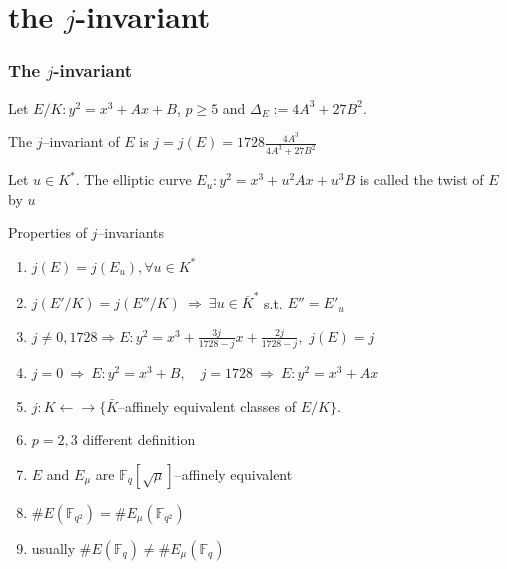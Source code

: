 \documentclass[10pt,handout]{beamer} %
\newcommand{\F}{\mathbb F}
\theoremstyle{definition}
\begin{document}

\section{the \texorpdfstring{$j$}{j}-invariant}
\begin{frame}
\frametitle{The $j$-invariant}
Let  $E/K: y^2=x^3+Ax+B$, $p\ge5$ and $\Delta_E:=4A^3+27B^2$. \pause

\begin{definition} The $j$--invariant of $E$ is
$j=j(E)=1728\frac{4A^3}{4A^3+27B^2}$
\end{definition}


  \begin{definition} Let $u\in K^*$. The elliptic curve $E_u:y^2=x^3+u^2Ax+u^3B$ is called the \alert{twist} of $E$ by $u$
\end{definition}


\begin{beamerboxesrounded}[upper=block title example,lower=block body alerted,shadow=true]{Properties of
$j$--invariants}
\begin{enumerate}[<+-| alert@+>]
  \item $j(E)=j(E_u), \forall u\in K^*$
  \item $j(E'/K)=j(E''/K)\ \Rightarrow\ \exists u\in\overline{K}^*$ s.t. $E''=E'_u$
  \item $j\ne 0,1728\Rightarrow E: y^2=x^3+\frac{3j}{1728-j}x+\frac{2j}{1728-j},$ $j(E)=j$
  \item $j=0\ \Rightarrow\ E: y^2=x^3+B,\quad j=1728\ \Rightarrow\ E: y^2=x^3+Ax$
  \item $j: K\leftarrow\!\rightarrow\{\bar{K}$--affinely
  equivalent classes of $E/K\}$.
  \item $p=2, 3$ different definition
 \item $E$ and $E_\mu$ are $\F_q[\sqrt{\mu}]$--affinely equivalent
  \item $\#E(\F_{q^2})=\#E_\mu(\F_{q^2})$
  \item usually $\#E(\F_{q})\neq\#E_\mu(\F_{q})$
  \end{enumerate}
\end{beamerboxesrounded}
\end{frame}
\end{document}
